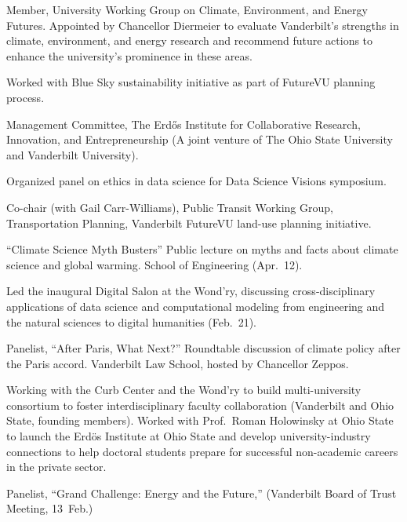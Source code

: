 \item[2021--2022] Member, University Working Group on Climate, Environment,
  and Energy Futures.
  Appointed by Chancellor Diermeier to evaluate Vanderbilt's strengths in climate,
  environment, and energy research and recommend future actions to enhance
  the university's prominence in these areas.
\item[2018--2019] Worked with Blue Sky sustainability initiative as part of
  FutureVU planning process.
\item[2017--2019] Management Committee, The Erd\H{o}s Institute for
  Collaborative Research, Innovation, and Entrepreneurship (A joint venture of
  The Ohio State University and Vanderbilt University).
\item[2018] Organized panel on ethics in data science for Data Science Visions
symposium.
\item[2017] Co-chair (with Gail Carr-Williams), Public Transit Working Group,
  Transportation Planning, Vanderbilt FutureVU land-use planning initiative.
\item[2017] ``Climate Science Myth Busters'' Public lecture on myths and facts
  about climate science and global warming. School of Engineering (Apr.~12).
\item[2017] Led the inaugural Digital Salon at the Wond'ry, discussing
  cross-disciplinary applications of data science and computational modeling
  from engineering and the natural sciences to digital humanities (Feb.~21).
\item[2016] Panelist, ``After Paris, What Next?''  Roundtable discussion of
  climate policy after the Paris accord. Vanderbilt Law School, hosted by
  Chancellor Zeppos.
\item[2015--2017] Working with the Curb Center and the Wond'ry to build
  multi-university consortium to foster interdisciplinary faculty collaboration
  (Vanderbilt and Ohio State, founding members).  Worked with Prof.\ Roman
  Holowinsky at Ohio State to launch the Erd\"os Institute at Ohio State and
  develop university-industry connections to help doctoral students prepare for
  successful non-academic careers in the private sector.
\item[2015] Panelist, ``Grand Challenge: Energy and the Future,'' (Vanderbilt
  Board of Trust Meeting, 13~Feb.)
